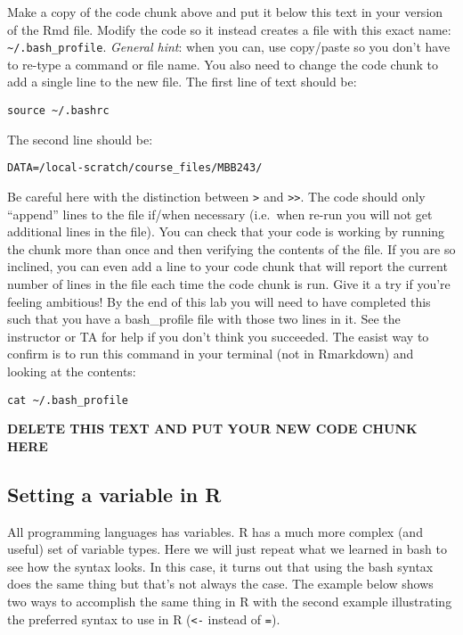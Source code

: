 \documentclass[
]{article}
\begin{document}
Make a copy of the code chunk above and put it below this text in your
version of the Rmd file. Modify the code so it instead creates a file
with this exact name: \texttt{\textasciitilde{}/.bash\_profile}.
\emph{General hint}: when you can, use copy/paste so you don't have to
re-type a command or file name. You also need to change the code chunk
to add a single line to the new file. The first line of text should be:

\texttt{source\ \textasciitilde{}/.bashrc}

The second line should be:

\texttt{DATA=/local-scratch/course\_files/MBB243/}

Be careful here with the distinction between \texttt{\textgreater{}} and
\texttt{\textgreater{}\textgreater{}}. The code should only ``append''
lines to the file if/when necessary (i.e.~when re-run you will not get
additional lines in the file). You can check that your code is working
by running the chunk more than once and then verifying the contents of
the file. If you are so inclined, you can even add a line to your code
chunk that will report the current number of lines in the file each time
the code chunk is run. Give it a try if you're feeling ambitious! By the
end of this lab you will need to have completed this such that you have
a bash\_profile file with those two lines in it. See the instructor or
TA for help if you don't think you succeeded. The easist way to confirm
is to run this command in your terminal (not in Rmarkdown) and looking
at the contents:

\texttt{cat\ \textasciitilde{}/.bash\_profile}

\textbf{DELETE THIS TEXT AND PUT YOUR NEW CODE CHUNK HERE}

\hypertarget{setting-a-variable-in-r}{%
\subsection{Setting a variable in R}\label{setting-a-variable-in-r}}

All programming languages has variables. R has a much more complex (and
useful) set of variable types. Here we will just repeat what we learned
in bash to see how the syntax looks. In this case, it turns out that
using the bash syntax does the same thing but that's not always the
case. The example below shows two ways to accomplish the same thing in R
with the second example illustrating the preferred syntax to use in R
(\texttt{\textless{}-} instead of \texttt{=}).
\end{document}
